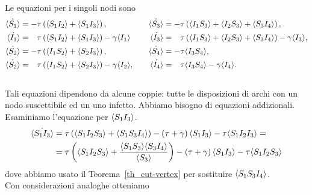 Le equazioni per i singoli nodi sono 
 \begin{equation*}
 \begin{aligned}
 \dot{\angol{S_1}}&= -\tau \tonde{ \angol{ S_1 I_2} + \angol{S_1 I_3}},  \quad 
 &\dot{\angol{S_3}}&= -\tau \tonde{ \angol{I_1 S_3} + \angol{I_2 S_3}+ \angol{S_3 I_4}},  \\
 \dot{\angol{I_1}}&= \spa \tau \tonde{ \angol{ S_1 I_2} + \angol{S_1 I_3}} - \gamma\angol{I_1} \quad 
 &\dot{\angol{I_3}}&= \spa \tau \tonde{ \angol{I_1 S_3} + \angol{I_2 S_3}+ \angol{S_3 I_4}}-\gamma\angol{I_3},\\
 \dot{\angol{S_2}}&= -\tau \tonde{ \angol{ I_1 S_2} + \angol{S_2 I_3}}, \quad &\dot{\angol{S_4}} &= -\tau \angol{I_3S_4},  \\
 \dot{\angol{S_2}}&= \spa \tau \tonde{ \angol{ I_1 S_2} + \angol{S_2 I_3}} - \gamma\angol{I_2},\quad & \dot{\angol{I_4}}&=\spa \tau\angol{I_3S_4}-\gamma\angol{I_4}. \\\
 \end{aligned}	
 \end{equation*}
 Tali equazioni dipendono da alcune coppie: tutte le disposizioni di archi con un nodo suscettibile ed un uno infetto. Abbiamo bisogno di equazioni addizionali.\\
 Esaminiamo l'equazione per $\langle S_1 I_3 \rangle$. 
 \begin{equation*}
 \begin{aligned}	
 \dot{\langle S_1I_3 \rangle}&= \tau\left(  \langle S_1I_2S_3 \rangle + \langle S_1S_3I_4 \rangle \right) - \left(  \tau +\gamma \right)\langle S_1 I_3 \rangle -\tau \langle  S_1 I_2 I_3 \rangle= \\
 &= \tau \left(  \langle S_1I_2S_3 \rangle + \frac{ \langle S_1S_3 \rangle\langle S_3 I_4 \rangle}{\langle S_3 \rangle} \right) -\left(  \tau + \gamma \right) \langle S_1I_3 \rangle - \tau \langle S_1I_2S_3 \rangle
 \end{aligned}
 \end{equation*}
 dove abbiamo usato il Teorema~\ref{th_cut-vertex} per sostituire $\langle S_1S_3I_4 \rangle$.\\
 Con considerazioni analoghe otteniamo
